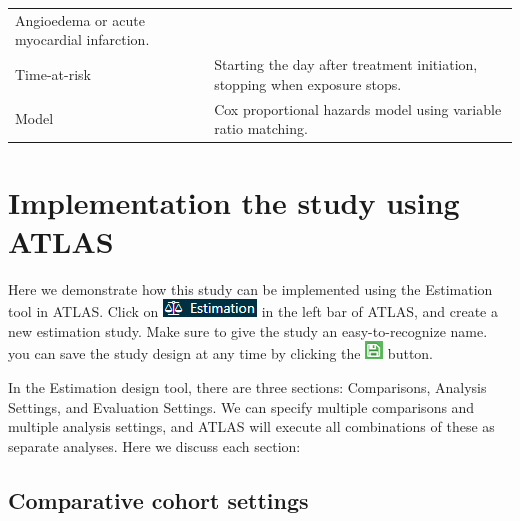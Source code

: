\documentclass[]{book}
\begin{document}
\begin{longtable}[]{@{}ll@{}}
\begin{minipage}[t]{0.71\columnwidth}
Angioedema or acute myocardial infarction.\strut
\end{minipage}\tabularnewline
\begin{minipage}[t]{0.23\columnwidth}\raggedright\strut
Time-at-risk\strut
\end{minipage} & \begin{minipage}[t]{0.71\columnwidth}\raggedright\strut
Starting the day after treatment initiation, stopping when exposure
stops.\strut
\end{minipage}\tabularnewline
\begin{minipage}[t]{0.23\columnwidth}\raggedright\strut
Model\strut
\end{minipage} & \begin{minipage}[t]{0.71\columnwidth}\raggedright\strut
Cox proportional hazards model using variable ratio matching.\strut
\end{minipage}\tabularnewline
\bottomrule
\end{longtable}

\section{Implementation the study using
ATLAS}\label{implementation-the-study-using-atlas}

Here we demonstrate how this study can be implemented using the
Estimation tool in ATLAS. Click on
\includegraphics{images/PopulationLevelEstimation/estimation.png} in the
left bar of ATLAS, and create a new estimation study. Make sure to give
the study an easy-to-recognize name. you can save the study design at
any time by clicking the
\includegraphics{images/PopulationLevelEstimation/save.png} button.

In the Estimation design tool, there are three sections: Comparisons,
Analysis Settings, and Evaluation Settings. We can specify multiple
comparisons and multiple analysis settings, and ATLAS will execute all
combinations of these as separate analyses. Here we discuss each
section:

\subsection{Comparative cohort settings}\label{ComparisonSettings}
\end{document}
